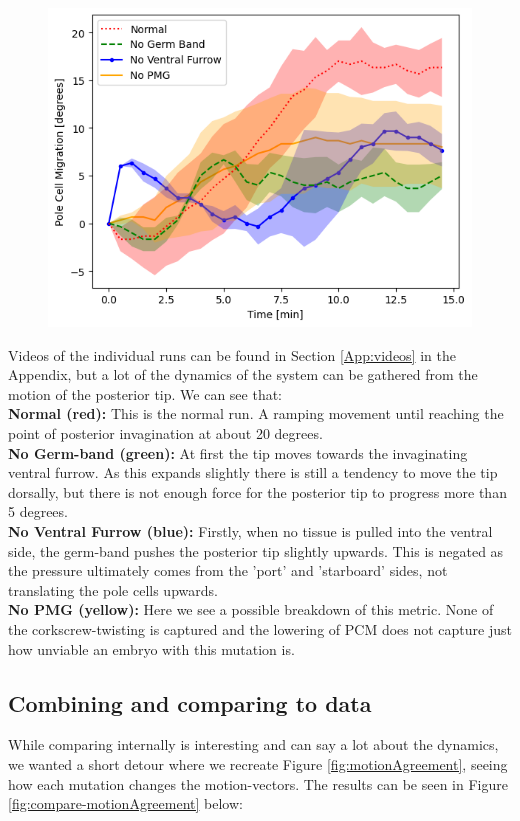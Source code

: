 \begin{figure}[H]
    \centering
    \includegraphics[width=1.\linewidth]{chapters/Results/figures/compare_PCM.png}
    \caption{}
    \label{fig:PCM-mutants}
\end{figure}

Videos of the individual runs can be found in Section \ref{App:videos} in the Appendix, but a lot of the dynamics of the system can be gathered from the motion of the posterior tip. We can see that:\\
\textbf{Normal (red):} This is the normal run. A ramping movement until reaching the point of posterior invagination at about 20 degrees. \\
\textbf{No Germ-band (green):} At first the tip moves towards the invaginating ventral furrow. As this expands slightly there is still a tendency to move the tip dorsally, but there is not enough force for the posterior tip to progress more than 5 degrees. \\
\textbf{No Ventral Furrow (blue):} Firstly, when no tissue is pulled into the ventral side, the germ-band pushes the posterior tip slightly upwards. This is negated as the pressure ultimately comes from the 'port' and 'starboard' sides, not translating the pole cells upwards.\\
\textbf{No PMG (yellow):} Here we see a possible breakdown of this metric. None of the corkscrew-twisting is captured and the lowering of PCM does not capture just how unviable an embryo with this mutation is.  


\subsection{Combining and comparing to data}
While comparing internally is interesting and can say a lot about the dynamics, we wanted a short detour where we recreate Figure \ref{fig:motionAgreement}, seeing how each mutation changes the motion-vectors. The results can be seen in Figure \ref{fig:compare-motionAgreement} below:

